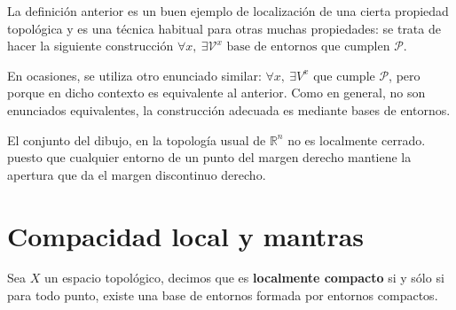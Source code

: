 \begin{obs}
La definición anterior es un buen ejemplo de localización de una cierta propiedad topológica y es una técnica habitual para otras muchas propiedades: se trata de hacer la siguiente construcción $\forall x,\ \exists \mathcal{V}^x \text{ base de entornos que cumplen } \mathcal{P}$.

En ocasiones, se utiliza otro enunciado similar: $\forall x,\ \exists V^x \text{ que cumple } \mathcal{P}$, pero porque en dicho contexto es equivalente al anterior. Como en general, no son enunciados equivalentes, la construcción adecuada es mediante bases de entornos.
\end{obs}

\begin{ej}
El conjunto del dibujo, en la topología usual de $\mathbb{R}^n$ no es localmente cerrado.
puesto que cualquier entorno de un punto del margen derecho mantiene la apertura que da el margen discontinuo derecho.
\end{ej}

\section{Compacidad local y mantras}%
\label{sec:compacidad_local_y_mantras}
\begin{defi}
Sea $X$ un espacio topológico, decimos que es \textbf{localmente compacto} si y sólo si para todo punto, existe una base de entornos formada por entornos compactos.
\end{defi}

